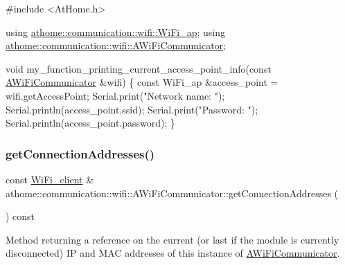 \begin{DoxyCode}
\textcolor{preprocessor}{#include <AtHome.h>}

\textcolor{keyword}{using} \mbox{\hyperlink{structathome_1_1communication_1_1wifi_1_1s__wifi__access__point}{athome::communication::wifi::WiFi\_ap}};
\textcolor{keyword}{using} \mbox{\hyperlink{classathome_1_1communication_1_1wifi_1_1_a_wi_fi_communicator}{athome::communication::wifi::AWiFiCommunicator}};

\textcolor{keywordtype}{void} my\_function\_printing\_current\_access\_point\_info(\textcolor{keyword}{const} \mbox{\hyperlink{classathome_1_1communication_1_1wifi_1_1_a_wi_fi_communicator_a0098148fe8d0eeee99b7f8f72a72a900}{AWiFiCommunicator}}
&wifi) \{ \textcolor{keyword}{const} WiFi\_ap &access\_point = wifi.getAccessPoint;
  Serial.print(\textcolor{stringliteral}{"Network name: "});
  Serial.println(access\_point.ssid);
  Serial.print(\textcolor{stringliteral}{"Password: "});
  Serial.println(access\_point.password);
\}
\end{DoxyCode}
 \mbox{\label{classathome_1_1communication_1_1wifi_1_1_a_wi_fi_communicator_afcc41f462a12c8348148c915dcafd1a0}} 
\subsubsection{\texorpdfstring{get\+Connection\+Addresses()}{getConnectionAddresses()}}
{\footnotesize\ttfamily const \mbox{\hyperlink{structathome_1_1communication_1_1wifi_1_1s__wifi__client}{Wi\+Fi\+\_\+client}} \& athome\+::communication\+::wifi\+::\+A\+Wi\+Fi\+Communicator\+::get\+Connection\+Addresses (\begin{DoxyParamCaption}{ }\end{DoxyParamCaption}) const}

Method returning a reference on the current (or last if the module is currently disconnected) IP and M\+AC addresses of this instance of \mbox{\hyperlink{classathome_1_1communication_1_1wifi_1_1_a_wi_fi_communicator}{A\+Wi\+Fi\+Communicator}}.

